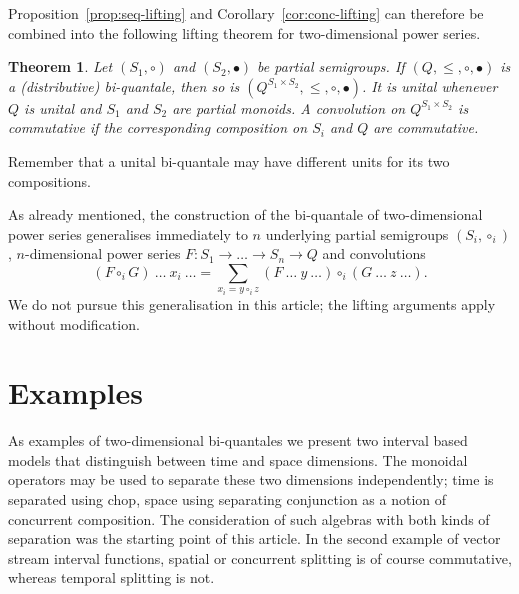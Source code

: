 \documentclass[12pt]{article}
\newtheorem{theorem}{Theorem}
\theoremstyle{definition}
\begin{document}
Proposition~\ref{prop:seq-lifting} and
Corollary~\ref{cor:conc-lifting} can therefore be combined into the
following lifting theorem for two-dimensional  power series.
\begin{theorem}\label{thm:biquantale}
  Let $(S_1,\circ)$ and $(S_2,\bullet)$ be partial semigroups. If
  $(Q,\le,\circ,\bullet)$ is a (distributive) bi-quantale, then so is
  $(Q^{S_1\times S_2},\le,\circ,\bullet)$. It is unital whenever $Q$
  is unital and $S_1$ and $S_2$ are partial monoids. A convolution on
  $Q^{S_1\times S_2}$ is commutative if the corresponding composition
  on $S_i$ and $Q$ are commutative.
\end{theorem}
Remember that a unital bi-quantale may have different units for its
two compositions.

As already mentioned, the construction of the bi-quantale of
two-dimensional power series generalises immediately to $n$ underlying
partial semigroups $(S_i,\circ_i)$, $n$-dimensional power series
$F:S_1\to \dots \to S_n\to Q$ and convolutions
\begin{equation*}
  (F\circ_i G)\ \dots \ x_i \ \ldots =\sum_{x_i=y\circ_i z} (F\ \dots \ y \ \dots)\circ_i (G\ \dots\ z\ \dots).
\end{equation*}
We do not pursue this generalisation in this article; the lifting
arguments apply without modification.



\section{Examples}\label{sec:biquantale-examples}

As examples of two-dimensional bi-quantales we present two interval
based models that distinguish between time and space dimensions. The
monoidal operators may be used to separate these two dimensions
independently; time is separated using chop, space using separating
conjunction as a notion of concurrent composition. The consideration
of such algebras with both kinds of separation was the starting point
of this article. In the second example of vector stream interval
functions, spatial or concurrent splitting is of course commutative,
whereas temporal splitting is not.
\end{document}
